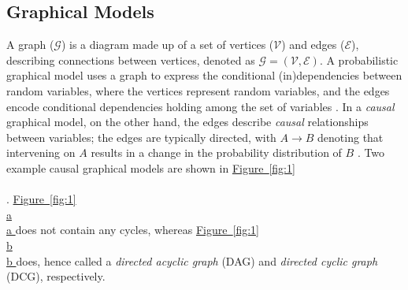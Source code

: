 \documentclass[11pt]{article}
\newcommand*{\figref}[2][]{%
  \hyperref[{fig:#2}]{%
    Figure~\ref*{fig:#2}%
    \ifx\\#1\\%
    \else
      #1%
    \fi
  }%
}
\begin{document}
\subsection{Graphical Models} 
\vspace{-1mm}

A graph ($\mathcal{G}$) is a diagram made up of a set of vertices ($\mathcal{V}$) and edges ($\mathcal{E}$), describing connections between vertices, denoted as $\mathcal{G} = (\mathcal{V},  \mathcal{E})$.
A probabilistic graphical model uses a graph to express the conditional (in)dependencies between random variables, where the vertices represent random variables, and the edges encode conditional dependencies holding among the set of variables \citep{lauritzen1996graphical}. 
In a \textit{causal} graphical model, on the other hand, the edges describe \textit{causal} relationships between variables; the edges are typically directed, with $A \rightarrow B$ denoting that intervening on $A$ results in a change in the probability distribution of $B$ \citep{geiger_logic_1990}. Two example causal graphical models are shown in \figref{1}. \figref[a]{1} does not contain any cycles, whereas \figref[b]{1} does, hence called a \textit{directed acyclic graph} (DAG) and \textit{directed cyclic graph} (DCG), respectively. 
\end{document}
